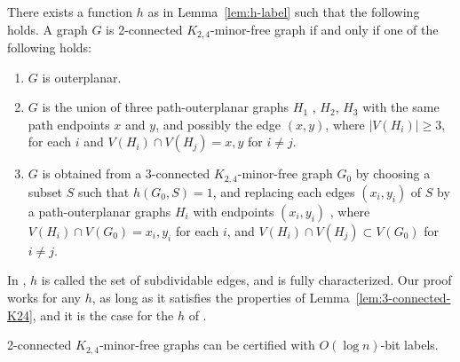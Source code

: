 \documentclass[a4paper,thm-restate,USenglish]{lipics-v2019}
\begin{document}
\begin{theorem}
There exists a function $h$ as in Lemma~\ref{lem:h-label} such that the following holds.
A graph $G$ is 2-connected $K_{2,4}$-minor-free graph if and only if one of the following holds:
\begin{enumerate}
    \item $G$ is outerplanar.
    \item $G$ is the union of three path-outerplanar graphs $H_1$ , $H_2$, $H_3$ with the same path endpoints $x$ and $y$, and possibly the edge $(x,y)$, where $|V (H_i)| \geq 3$, for each $i$ and $V (H_i) \cap V(H_j) = {x, y}$ for $i \neq j$.
    \item  $G$ is obtained from a 3-connected $K_{2,4}$-minor-free graph $G_0$ by choosing a subset $S$ such that $h(G_0,S)=1$, and replacing each edges $(x_i,y_i)$ of $S$ by a path-outerplanar graphs $H_i$ with endpoints $(x_i,y_i)$ , where $V(H_i)\cap V (G_0) = {x_i , y_i }$ for each $i$, and $V(H_i)\cap V(H_j) \subset V(G_0)$ for $i \neq j$. 
\end{enumerate}
\end{theorem}

In \cite{EllinghamMOT16}, $h$ is called the set of subdividable edges, and is fully characterized. Our proof works for any $h$, as long as it satisfies the properties of Lemma~\ref{lem:3-connected-K24}, and it is the case for the $h$ of \cite{EllinghamMOT16}.

\begin{lemma}\label{lem:2-connected-K24}
2-connected $K_{2,4}$-minor-free graphs can be certified with $O(\log n)$-bit labels.
\end{lemma}
\end{document}
